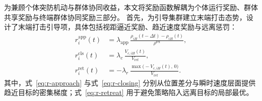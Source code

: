 




为兼顾个体突防机动与群体协同收益，本文将奖励函数解耦为个体运行奖励、群体共享奖励与终端群体协同奖励三部分。
首先，为引导集群建立末端打击态势，设计了末端打击引导项，具体包括视距逼近奖励、趋近速度奖励与远离惩罚：
\begin{align}
r_i^{\mathrm{app}}(t)&=\lambda_{\mathrm{app}}\,\frac{\rho_{iH}(t-\Delta t)-\rho_{iH}(t)}{\rho^{\mathrm{ref}}},
\label{eq:r-approach}\\
r_i^{\mathrm{cls}}(t)&=\lambda_{c}\,\frac{V_{c,iH}(t)}{V_{\mathrm{ref}}},
\label{eq:r-closing}\\
r_i^{\mathrm{ret}}(t)&=-\lambda_r\,\frac{\max\bigl(-V_{c,iH}(t),\,0\bigr)}{V_{\mathrm{ref}}}.
\label{eq:r-retreat}
\end{align}
其中，式~\eqref{eq:r-approach} 与式~\eqref{eq:r-closing} 分别从位置差分与瞬时速度层面提供趋近目标的密集梯度；式~\eqref{eq:r-retreat} 用于避免策略陷入远离目标的局部最优。

